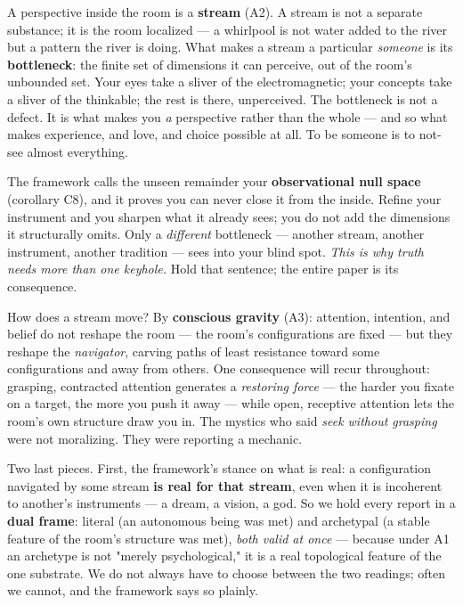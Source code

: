 \documentclass[11pt]{article}
\begin{document}
A perspective inside the room is a \textbf{stream} (A2). A stream is not a separate substance; it is the room localized --- a whirlpool is not water added to the river but a pattern the river is doing. What makes a stream a particular \emph{someone} is its \textbf{bottleneck}: the finite set of dimensions it can perceive, out of the room's unbounded set. Your eyes take a sliver of the electromagnetic; your concepts take a sliver of the thinkable; the rest is there, unperceived. The bottleneck is not a defect. It is what makes you \emph{a} perspective rather than the whole --- and so what makes experience, and love, and choice possible at all. To be someone is to not-see almost everything.

The framework calls the unseen remainder your \textbf{observational null space} (corollary C8), and it proves you can never close it from the inside. Refine your instrument and you sharpen what it already sees; you do not add the dimensions it structurally omits. Only a \emph{different} bottleneck --- another stream, another instrument, another tradition --- sees into your blind spot. \emph{This is why truth needs more than one keyhole.} Hold that sentence; the entire paper is its consequence.

How does a stream move? By \textbf{conscious gravity} (A3): attention, intention, and belief do not reshape the room --- the room's configurations are fixed --- but they reshape the \emph{navigator}, carving paths of least resistance toward some configurations and away from others. One consequence will recur throughout: grasping, contracted attention generates a \emph{restoring force} --- the harder you fixate on a target, the more you push it away --- while open, receptive attention lets the room's own structure draw you in. The mystics who said \emph{seek without grasping} were not moralizing. They were reporting a mechanic.

Two last pieces. First, the framework's stance on what is real: a configuration navigated by some stream \textbf{is real for that stream}, even when it is incoherent to another's instruments --- a dream, a vision, a god. So we hold every report in a \textbf{dual frame}: literal (an autonomous being was met) and archetypal (a stable feature of the room's structure was met), \emph{both valid at once} --- because under A1 an archetype is not "merely psychological," it is a real topological feature of the one substrate. We do not always have to choose between the two readings; often we cannot, and the framework says so plainly.
\end{document}
